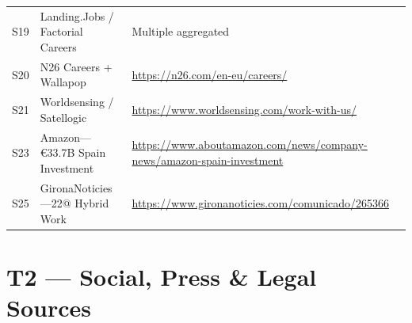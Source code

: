 \documentclass[a4paper,11pt,openany]{report}
\begin{document}
{\begin{longtable}{l p{5cm} p{6.5cm}}
S19 & Landing.Jobs / Factorial Careers & Multiple aggregated \\
S20 & N26 Careers + Wallapop & \url{https://n26.com/en-eu/careers/} \\
S21 & Worldsensing / Satellogic & \url{https://www.worldsensing.com/work-with-us/} \\
S23 & Amazon---€33.7B Spain Investment & \url{https://www.aboutamazon.com/news/company-news/amazon-spain-investment} \\
S25 & GironaNoticies---22@ Hybrid Work & \url{https://www.gironanoticies.com/comunicado/265366} \\
\bottomrule
\end{longtable}
}

\section{T2 --- Social, Press \& Legal Sources}
\end{document}
